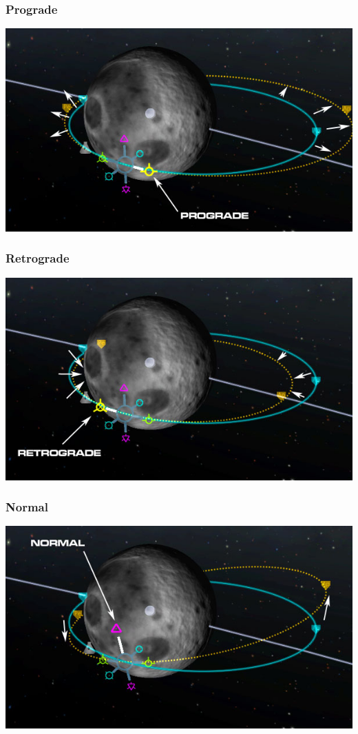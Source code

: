 {\begin{frame}
\begin{block}{}
\begin{center}
        \end{center}
    \end{block}
\end{frame}
}

\begin{frame}
    \frametitle{Prograde}
    \begin{center}
        \includegraphics[scale=0.4]{images/prograde}
    \end{center}
\end{frame}
\begin{frame}
    \frametitle{Retrograde}
    \begin{center}
        \includegraphics[scale=0.5]{images/retrograde}
    \end{center}
\end{frame}
\begin{frame}
    \frametitle{Normal}
    \begin{center}
        \includegraphics[scale=0.5]{images/normal}
    \end{center}
\end{frame}
